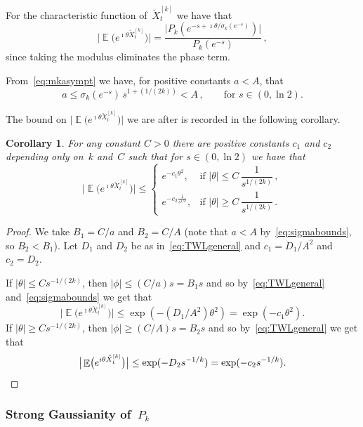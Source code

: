 \documentclass[12pt]{amsart}
\newtheorem{corollaryL}{Corollary}
\theoremstyle{definition}
\DeclareMathOperator{\E}{\mathbb{E}}
\begin{document}
For the characteristic function of~$\breve{X}^{[k]}_t$ we have that
\[
\big|\E\!\big(e^{\imath \theta\breve{X}^{[k]}_t}\big)\big| = \frac{\big|P_k(e^{-s+\imath \theta/\sigma_k(e^{-s})})\big|}{P_k(e^{-s})}\,,
\]
since taking the modulus eliminates the phase term.
\smallskip

From~\eqref{eq:mkasympt} we have, for positive constants $a<A$, that
\begin{equation}\label{eq:sigmabounds}
a \le \sigma_k(e^{-s})\, s^{1+(1/(2k))} < A\,, \qquad \text{for } s\in(0,\ln 2).
\end{equation}

The bound on $\big|\E\!\big(e^{\imath \theta\breve{X}^{[k]}_t}\big)\big|$ we are after is recorded in the following corollary.

\begin{corollaryL}\label{cor:bounds for char Pk}
For any constant $C>0$ there are positive constants $c_1$ and $c_2$ depending
only on~$k$ and~$C$ such that for $s\in(0,\ln 2)$ we have that
\[
\big|\E\!\big(e^{\imath \theta\breve{X}^{[k]}_t}\big)\big| \le
\begin{cases}
e^{-c_1\theta^2}, & \text{if } |\theta|\le C\,\dfrac{1}{s^{1/(2k)}}\,,\\[8pt]
e^{-c_2\frac{1}{s^{1/k}}}, & \text{if } |\theta|\ge C\,\dfrac{1}{s^{1/(2k)}}\,.
\end{cases}
\]
\end{corollaryL}

\begin{proof}
We take $B_1 = C/a$ and $B_2 = C/A$ (note that $a<A$ by~\eqref{eq:sigmabounds}, so $B_2<B_1$). Let
$D_1$ and $D_2$ be as in~\eqref{eq:TWLgeneral} and $c_1 = D_1/A^2$ and $c_2 = D_2$.
\smallskip

If $|\theta|\le C s^{-1/(2k)}$, then $|\phi|\le (C/a)s = B_1 s$ and so by~\eqref{eq:TWLgeneral} and~\eqref{eq:sigmabounds} we get that
\[
\big|\E\!\big(e^{\imath \theta\breve{X}^{[k]}_t}\big)\big| \le \exp(-(D_1/A^2)\theta^2) = \exp(-c_1\theta^2).
\]
If $|\theta|\ge C s^{-1/(2k)}$, then $|\phi|\ge (C/A)s = B_2 s$ and so by~\eqref{eq:TWLgeneral} we get that
\[
\big|\E\!\big(e^{\imath \theta\breve{X}^{[k]}_t}\big)\big| \le \exp(-D_2 s^{-1/k}) = \exp(-c_2 s^{-1/k}). \qedhere
\]
\end{proof}


\subsubsection{Strong Gaussianity of~$P_k$}
\end{document}
